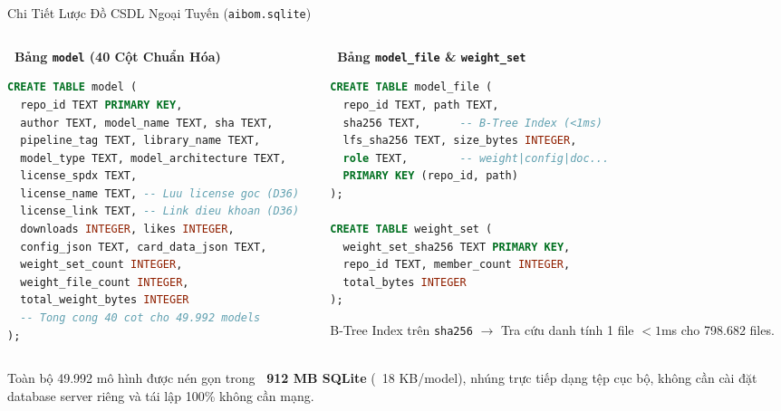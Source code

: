 \documentclass[aspectratio=169, xcolor=table]{beamer}
\begin{document}
\begin{frame}[fragile]{Chi Tiết Lược Đồ CSDL Ngoại Tuyến (\texttt{aibom.sqlite})}
    \begin{columns}[onlytextwidth, T]
        \begin{column}{0.49\textwidth}
            \textbf{\textcolor{myprimary}{\faTable \ Bảng \texttt{model} (40 Cột Chuẩn Hóa)}}
            \begin{lstlisting}[language=sql, basicstyle=\ttfamily\fontsize{5.0}{6.0}\selectfont]
CREATE TABLE model (
  repo_id TEXT PRIMARY KEY,
  author TEXT, model_name TEXT, sha TEXT,
  pipeline_tag TEXT, library_name TEXT,
  model_type TEXT, model_architecture TEXT,
  license_spdx TEXT,
  license_name TEXT, -- Luu license goc (D36)
  license_link TEXT, -- Link dieu khoan (D36)
  downloads INTEGER, likes INTEGER,
  config_json TEXT, card_data_json TEXT,
  weight_set_count INTEGER,
  weight_file_count INTEGER,
  total_weight_bytes INTEGER
  -- Tong cong 40 cot cho 49.992 models
);
            \end{lstlisting}
        \end{column}
        \hfill
        \begin{column}{0.49\textwidth}
            \textbf{\textcolor{myaccent}{\faTable \ Bảng \texttt{model\_file} \& \texttt{weight\_set}}}
            \begin{lstlisting}[language=sql, basicstyle=\ttfamily\fontsize{5.0}{6.0}\selectfont]
CREATE TABLE model_file (
  repo_id TEXT, path TEXT,
  sha256 TEXT,      -- B-Tree Index (<1ms)
  lfs_sha256 TEXT, size_bytes INTEGER,
  role TEXT,        -- weight|config|doc...
  PRIMARY KEY (repo_id, path)
);

CREATE TABLE weight_set (
  weight_set_sha256 TEXT PRIMARY KEY,
  repo_id TEXT, member_count INTEGER,
  total_bytes INTEGER
);
            \end{lstlisting}
            \vspace{-0.15cm}
            \begin{infobox}
                \tiny
                B-Tree Index trên \texttt{sha256} $\to$ Tra cứu danh tính 1 file $<1$ms cho 798.682 files.
            \end{infobox}
        \end{column}
    \end{columns}
    \vspace{0.1cm}
    \begin{successbox}
        \scriptsize
        Toàn bộ 49.992 mô hình được nén gọn trong \textbf{~912 MB SQLite} (~18 KB/model), nhúng trực tiếp dạng tệp cục bộ, không cần cài đặt database server riêng và tái lập 100\% không cần mạng.
    \end{successbox}
\end{frame}
\end{document}
